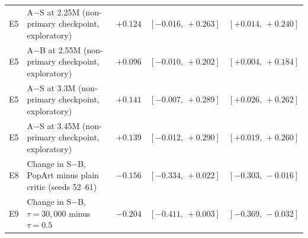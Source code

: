\begin{table}[H]
\begin{tabular}{@{}l>{\raggedright\arraybackslash}p{}ccc@{}}
E5 & A$-$S at 2.25M (non-primary checkpoint, exploratory) & $+0.124$ & $[-0.016,\,+0.263]$ & $[+0.014,\,+0.240]$ \\
E5 & A$-$B at 2.55M (non-primary checkpoint, exploratory) & $+0.096$ & $[-0.010,\,+0.202]$ & $[+0.004,\,+0.184]$ \\
E5 & A$-$S at 3.3M (non-primary checkpoint, exploratory) & $+0.141$ & $[-0.007,\,+0.289]$ & $[+0.026,\,+0.262]$ \\
E5 & A$-$S at 3.45M (non-primary checkpoint, exploratory) & $+0.139$ & $[-0.012,\,+0.290]$ & $[+0.019,\,+0.260]$ \\
E8 & Change in S$-$B, PopArt minus plain critic (seeds 52--61) & $-0.156$ & $[-0.334,\,+0.022]$ & $[-0.303,\,-0.016]$ \\
E9 & Change in S$-$B, $\tau{=}30{,}000$ minus $\tau{=}0.5$ & $-0.204$ & $[-0.411,\,+0.003]$ & $[-0.369,\,-0.032]$ \\
\bottomrule
\end{tabular}
\end{table}
